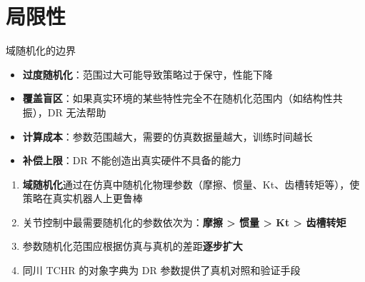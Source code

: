 \section{局限性}

\begin{cautionbox}{域随机化的边界}
\begin{itemize}
    \item \textbf{过度随机化}：范围过大可能导致策略过于保守，性能下降
    \item \textbf{覆盖盲区}：如果真实环境的某些特性完全不在随机化范围内（如结构性共振），DR 无法帮助
    \item \textbf{计算成本}：参数范围越大，需要的仿真数据量越大，训练时间越长
    \item \textbf{补偿上限}：DR 不能创造出真实硬件不具备的能力
\end{itemize}
\end{cautionbox}

\begin{summarybox}{}
\begin{enumerate}
  \item \textbf{域随机化}通过在仿真中随机化物理参数（摩擦、惯量、Kt、齿槽转矩等），使策略在真实机器人上更鲁棒
  \item 关节控制中最需要随机化的参数依次为：\textbf{摩擦 > 惯量 > Kt > 齿槽转矩}
  \item 参数随机化范围应根据仿真与真机的差距\textbf{逐步扩大}
  \item 同川 TCHR 的对象字典为 DR 参数提供了真机对照和验证手段
\end{enumerate}
\end{summarybox}
